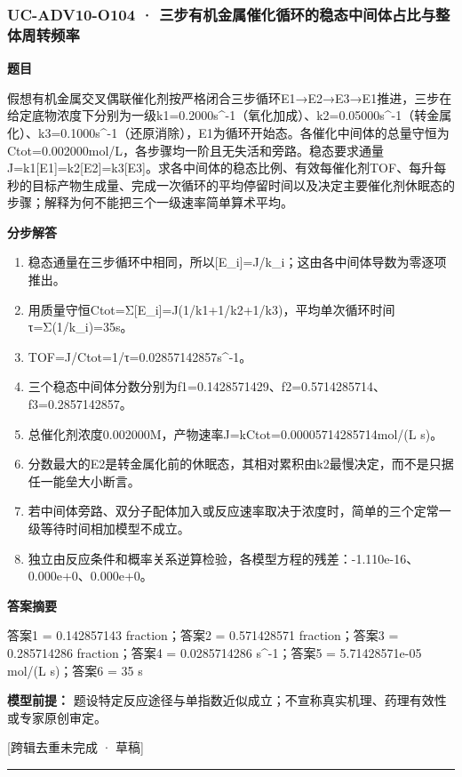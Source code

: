 \documentclass[UTF8,11pt,a4paper]{ctexart}
\begin{document}
\subsubsection*{UC-ADV10-O104 · 三步有机金属催化循环的稳态中间体占比与整体周转频率}
\noindent\textbf{题目}\par
假想有机金属交叉偶联催化剂按严格闭合三步循环E1→E2→E3→E1推进，三步在给定底物浓度下分别为一级k1=0.2000s\textasciicircum{}-1（氧化加成）、k2=0.05000s\textasciicircum{}-1（转金属化）、k3=0.1000s\textasciicircum{}-1（还原消除），E1为循环开始态。各催化中间体的总量守恒为Ctot=0.002000mol/L，各步骤均一阶且无失活和旁路。稳态要求通量J=k1[E1]=k2[E2]=k3[E3]。求各中间体的稳态比例、有效每催化剂TOF、每升每秒的目标产物生成量、完成一次循环的平均停留时间以及决定主要催化剂休眠态的步骤；解释为何不能把三个一级速率简单算术平均。\par
\medskip\noindent\textbf{分步解答}
\begin{enumerate}
\item 稳态通量在三步循环中相同，所以[E\_i]=J/k\_i；这由各中间体导数为零逐项推出。
\item 用质量守恒Ctot=Σ[E\_i]=J(1/k1+1/k2+1/k3)，平均单次循环时间τ=Σ(1/k\_i)=35s。
\item TOF=J/Ctot=1/τ=0.02857142857s\textasciicircum{}-1。
\item 三个稳态中间体分数分别为f1=0.1428571429、f2=0.5714285714、f3=0.2857142857。
\item 总催化剂浓度0.002000M，产物速率J=kCtot=0.00005714285714mol/(L s)。
\item 分数最大的E2是转金属化前的休眠态，其相对累积由k2最慢决定，而不是只据任一能垒大小断言。
\item 若中间体旁路、双分子配体加入或反应速率取决于浓度时，简单的三个定常一级等待时间相加模型不成立。
\item 独立由反应条件和概率关系逆算检验，各模型方程的残差：-1.110e-16、0.000e+0、0.000e+0。
\end{enumerate}
\noindent\textbf{答案摘要}\par
答案1 = 0.142857143 fraction；答案2 = 0.571428571 fraction；答案3 = 0.285714286 fraction；答案4 = 0.0285714286 s\textasciicircum{}-1；答案5 = 5.71428571e-05 mol/(L s)；答案6 = 35 s\par
\noindent\textbf{模型前提：}
题设特定反应途径与单指数近似成立；不宣称真实机理、药理有效性或专家原创审定。\par
\noindent\textcolor{red!65!black}{[跨辑去重未完成 · 草稿]} \par
\medskip\hrule\medskip
{}
\end{document}
